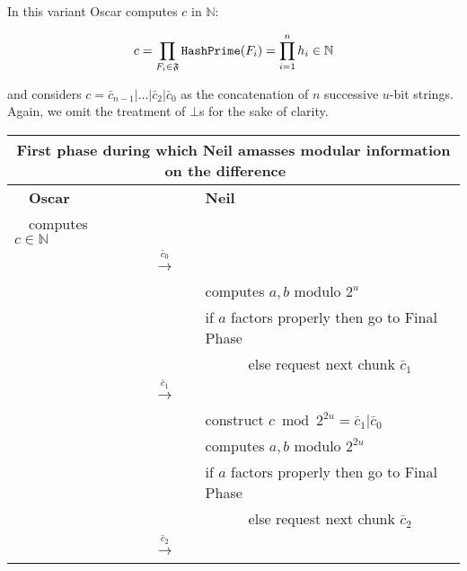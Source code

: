 \documentclass[11pt]{llncs}
\begin{document}
In this variant Oscar computes $c$ in $\mathbb{N}$:

$$
c=\prod_{F_i\in \mathfrak{F}} \mbox{{\tt HashPrime}}(F_i) = \prod_{i=1}^n h_i \in \mathbb{N}
$$

and considers $c=\bar{c}_{n-1}|\ldots|\bar{c}_2|\bar{c}_0$ as the concatenation of $n$ successive $u$-bit strings. Again, we omit the treatment of $\bot$s for the sake of clarity.

\begin{center}
\begin{tabular}{lcl}\toprule
\multicolumn{3}{c}{{\sf First phase during which Neil amasses modular
information on the difference~~}} \\\midrule
~~{\bf Oscar}                      &                                                      &   {\bf Neil}~\\
~~computes $c\in \mathbb{N}$       &                                                      &\\
                                   &~~{{\LARGE $\stackrel{\bar{c}_0}{\longrightarrow}$}}~~&   \\
                                   &                                                      &computes $a,b$ modulo $2^u$~\\
                                   &                                                      &if $a$ factors properly then go to {\sf Final Phase}~~\\
                                   &                                                      &~~~~~~else request next chunk $\bar{c}_1$~~\\
                                   &~~{{\LARGE $\stackrel{\bar{c}_1}{\longrightarrow}$}}~~&   \\
                                   &                                                      &construct $c \bmod 2^{2u}=\bar{c}_1|\bar{c}_0$~~\\
                                   &                                                      &computes $a,b$ modulo $2^{2u}$~\\
                                   &                                                      &if $a$ factors properly then go to {\sf Final Phase}~~\\
                                   &                                                      &~~~~~~else request next chunk $\bar{c}_2$~~\\
                                   &~~{{\LARGE $\stackrel{\bar{c}_2}{\longrightarrow}$}}~~      &   \\

\end{tabular}
\end{center}
\end{document}
